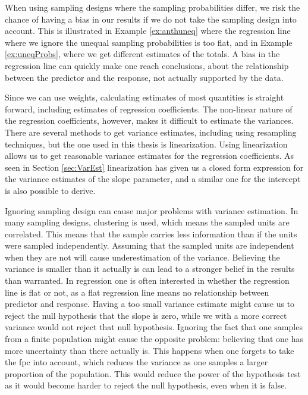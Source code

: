 \documentclass{article}
\begin{document}

When using sampling designs where the sampling probabilities differ, we risk the
chance of having a bias in our results if we do not take the sampling design into account. This
is illustrated in Example \ref{ex:anthuneq} where the regression line where we ignore the
unequal sampling probabilities is too flat, and in Example \ref{ex:uneqProbs},
where we get different estimates of the totals. A bias in the regression line
can quickly make one reach conclusions, about the relationship between the
predictor and the response, not actually supported by the data.


Since we can use weights, calculating estimates of most quantities is
straight forward, including estimates of regression coefficients. The non-linear nature
of the regression coefficients, however, makes it difficult to estimate the
variances. There are several methods to get variance estimates, including using
resampling techniques, but the one used in this thesis is linearization. Using
linearization allows us to get reasonable variance estimates for the regression
coefficients. As seen in Section \ref{sec:VarEst} linearization has given us a
closed form expression for the variance estimates of the slope parameter, and a
similar one for the intercept is also possible to derive.

%

Ignoring sampling design can cause major problems with variance estimation. In
many sampling designs, clustering is used, which means the sampled units are correlated. This means
that the sample carries less information than if the units were sampled independently.
Assuming that the sampled units are independent when they are not
will cause underestimation of the variance. Believing the variance is smaller
than it actually is can lead to a stronger belief in the results than warranted.
In regression one is often interested in whether the regression line is flat or
not, as a flat regression line means no relationship between predictor and response. Having a too small variance estimate might cause us to reject the null
hypothesis that the slope is zero, while we with a more correct variance would
not reject that null hypothesis. Ignoring the fact that one samples from a
finite population might cause the opposite problem: believing that one has
more uncertainty than there actually is. This happens when one forgets to take
the fpc into account, which reduces the variance as one samples a larger
proportion of the population. This would reduce the power of the hypothesis test
as it would become harder to reject the null hypothesis, even when it is false.
\end{document}
